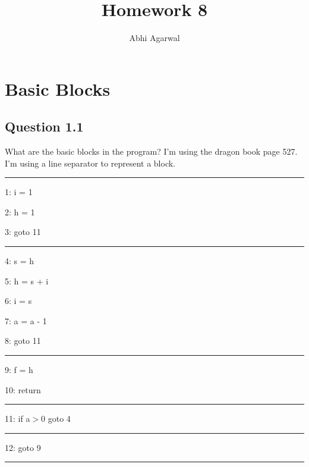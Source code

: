\documentclass[11pt, oneside]{article}   	%
\title{Homework 8}
\author{Abhi Agarwal}
\date{}
\begin{document}
\maketitle

\section{Basic Blocks}

\subsection{Question 1.1}

\par What are the basic blocks in the program? I'm using the dragon book page 527. I'm using a line separator to represent a block.
\par \noindent\rule{8cm}{0.4pt}
\par 1: i = 1
\par 2: h = 1
\par 3: goto 11
\par \noindent\rule{8cm}{0.4pt}
\par 4: s = h
\par 5: h = s + i
\par 6: i = s
\par 7: a = a - 1
\par 8: goto 11
\par \noindent\rule{8cm}{0.4pt}
\par 9: f = h
\par 10: return
\par \noindent\rule{8cm}{0.4pt}
\par 11: if a$>$0 goto 4
\par \noindent\rule{8cm}{0.4pt}
\par 12: goto 9
\par \noindent\rule{8cm}{0.4pt}

\newpage
\end{document}
